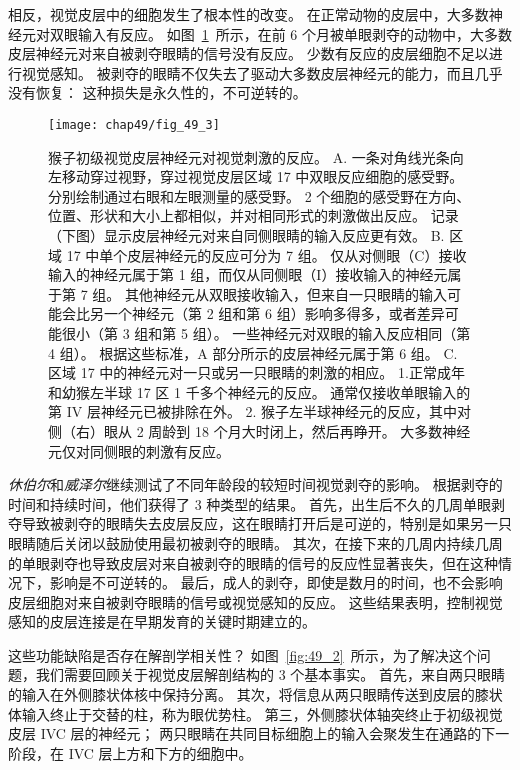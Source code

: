 相反，视觉皮层中的细胞发生了根本性的改变。
在正常动物的皮层中，大多数神经元对双眼输入有反应。
如图~\ref{fig:49_3}~所示，在前 6 个月被单眼剥夺的动物中，大多数皮层神经元对来自被剥夺眼睛的信号没有反应。
少数有反应的皮层细胞不足以进行视觉感知。
被剥夺的眼睛不仅失去了驱动大多数皮层神经元的能力，而且几乎没有恢复：
这种损失是永久性的，不可逆转的。


\begin{figure}[htbp]
	\centering
	\texttt{[image: chap49/fig\_49\_3]}
	\caption{猴子初级视觉皮层神经元对视觉刺激的反应\cite{hubel1977ferrier}。
		A. 一条对角线光条向左移动穿过视野，穿过视觉皮层区域 17 中双眼反应细胞的感受野。
		分别绘制通过右眼和左眼测量的感受野。
		2 个细胞的感受野在方向、位置、形状和大小上都相似，并对相同形式的刺激做出反应。
		记录（下图）显示皮层神经元对来自同侧眼睛的输入反应更有效。
		B. 区域 17 中单个皮层神经元的反应可分为 7 组。
		仅从对侧眼（C）接收输入的神经元属于第 1 组，而仅从同侧眼（I）接收输入的神经元属于第 7 组。
		其他神经元从双眼接收输入，但来自一只眼睛的输入可能会比另一个神经元（第 2 组和第 6 组）影响多得多，或者差异可能很小（第 3 组和第 5 组）。
		一些神经元对双眼的输入反应相同（第 4 组）。
		根据这些标准，A 部分所示的皮层神经元属于第 6 组。
		C. 区域 17 中的神经元对一只或另一只眼睛的刺激的相应。
		1.正常成年和幼猴左半球 17 区 1 千多个神经元的反应。
		通常仅接收单眼输入的第 IV 层神经元已被排除在外。
		2. 猴子左半球神经元的反应，其中对侧（右）眼从 2 周龄到 18 个月大时闭上，然后再睁开。
		大多数神经元仅对同侧眼的刺激有反应。}
	\label{fig:49_3}
\end{figure}


\textit{休伯尔}和\textit{威泽尔}继续测试了不同年龄段的较短时间视觉剥夺的影响。
根据剥夺的时间和持续时间，他们获得了 3 种类型的结果。
首先，出生后不久的几周单眼剥夺导致被剥夺的眼睛失去皮层反应，这在眼睛打开后是可逆的，特别是如果另一只眼睛随后关闭以鼓励使用最初被剥夺的眼睛。
其次，在接下来的几周内持续几周的单眼剥夺也导致皮层对来自被剥夺的眼睛的信号的反应性显著丧失，但在这种情况下，影响是不可逆转的。
最后，成人的剥夺，即使是数月的时间，也不会影响皮层细胞对来自被剥夺眼睛的信号或视觉感知的反应。
这些结果表明，控制视觉感知的皮层连接是在早期发育的关键时期建立的。


这些功能缺陷是否存在解剖学相关性？
如图~\ref{fig:49_2}~所示，为了解决这个问题，我们需要回顾关于视觉皮层解剖结构的 3 个基本事实。
首先，来自两只眼睛的输入在外侧膝状体核中保持分离。
其次，将信息从两只眼睛传送到皮层的膝状体输入终止于交替的柱，称为眼优势柱。
第三，外侧膝状体轴突终止于初级视觉皮层 IVC 层的神经元；
两只眼睛在共同目标细胞上的输入会聚发生在通路的下一阶段，在 IVC 层上方和下方的细胞中。


